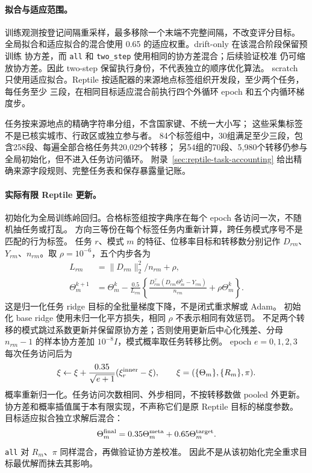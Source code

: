 \documentclass[UTF8,11pt]{ctexart}
\begin{document}
\FloatBarrier
\paragraph{拟合与适应范围。}
训练观测按登记间隔重采样，最多移除一个末端不完整间隔，不改变评分目标。
全局拟合和适应拟合的混合使用 0.65 的适应权重。drift-only 在该混合阶段保留预训练
协方差，而 \texttt{all} 和 \texttt{two\_step} 使用相同的协方差混合；后续验证校准
仍可缩放协方差。因此 two-step 保留执行身份，不代表独立的顺序优化算法。
scratch 只使用适应拟合。Reptile 按适配器的来源地点标签组织开发段，至少两个任务，每任务至少
三段，在相同目标适应混合前执行四个外循环 epoch 和五个内循环梯度步。

任务按来源地点的精确字符串分组，不含国家键、不统一大小写；
这些采集标签不是已核实城市、行政区或独立参与者。
84个标签组中，30组满足至少三段，包含258段、每遍全部合格任务共20,029个转移；
另54组的70段、5,980个转移仍参与全局初始化，但不进入任务访问循环。
附录~\ref{sec:reptile-task-accounting} 给出精确来源字段规则、完整任务表和保存暴露量记账。

\paragraph{实际有限 Reptile 更新。}
初始化为全局训练岭回归。合格标签组按字典序在每个 epoch 各访问一次，不随机抽任务或打乱。
方向三等份在每个标签任务内重新计算，跨任务模式序号不是匹配的行为标签。
任务 \(r\)、模式 \(m\) 的特征、位移率目标和转移数分别记作
\(D_{rm}\)、\(Y_{rm}\)、\(n_{rm}\)。取 \(\rho=10^{-6}\)，五个内步各为
\begin{equation}
\begin{aligned}
L_{rm}&=\|D_{rm}\|_2^2/n_{rm}+\rho,\\
\Theta_m^{k+1}&=\Theta_m^k-\frac{0.5}{L_{rm}}
\left\{\frac{D_{rm}^{\top}(D_{rm}\Theta_m^k-Y_{rm})}{n_{rm}}
                 +\rho\Theta_m^k\right\}.
\end{aligned}
\label{eq:meta-inner}
\end{equation}
这是归一化任务 ridge 目标的全批量梯度下降，不是闭式重求解或 Adam。
初始化 base ridge 使用未归一化平方损失，相同 \(\rho\) 不表示相同有效惩罚。
不足两个转移的模式跳过系数更新并保留原协方差；否则使用更新后中心化残差、分母
\(n_{rm}-1\) 的样本协方差加 \(10^{-8}I\)，模式概率取任务转移比例。
epoch \(e=0,1,2,3\) 每次任务访问后为
\begin{equation}
\xi\leftarrow\xi+\frac{0.35}{\sqrt{e+1}}(\xi_r^{\rm inner}-\xi),
\qquad\xi=(\{\Theta_m\},\{R_m\},\pi).
\label{eq:meta-outer}
\end{equation}
概率重新归一化。任务访问次数相同、外步相同，不按转移数做 pooled 外更新。
协方差和概率插值属于本有限实现，不声称它们是原 Reptile 目标的梯度参数。
目标适应拟合独立求解后混合：
\begin{equation}
\Theta_m^{\rm final}=0.35\Theta_m^{\rm meta}+0.65\Theta_m^{\rm target}.
\label{eq:target-blend}
\end{equation}
\texttt{all} 对 \(R_m\)、\(\pi\) 同样混合，再做验证协方差校准。
因此不是从该初始化完全重求目标最优解而抹去其影响。
\end{document}
